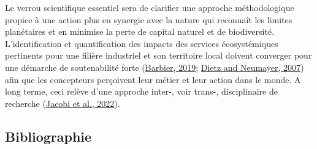 \documentclass[
  12pt,
  oneside]{book}
\begin{document}
Le verrou scientifique essentiel sera de clarifier une approche méthodologique propice à une action plus en synergie avec la nature qui reconnaît les limites planétaires et en minimise la perte de capital naturel et de biodiversité. L'identification et quantification des impacts des services écosystémiques pertinents pour une filière industriel et son territoire local doivent converger pour une démarche de soutenabilité forte (\protect\hyperlink{ref-Barbier2019}{Barbier, 2019}; \protect\hyperlink{ref-Dietz2006}{Dietz and Neumayer, 2007}) afin que les concepteurs perçoivent leur métier et leur action dans le monde. A long terme, ceci relève d'une approche inter-, voir trans-, disciplinaire de recherche (\protect\hyperlink{ref-Jacobi2022}{Jacobi et al., 2022}).

\newpage

\hypertarget{bibliographie}{%
\subsection{Bibliographie}\label{bibliographie}}
\end{document}
